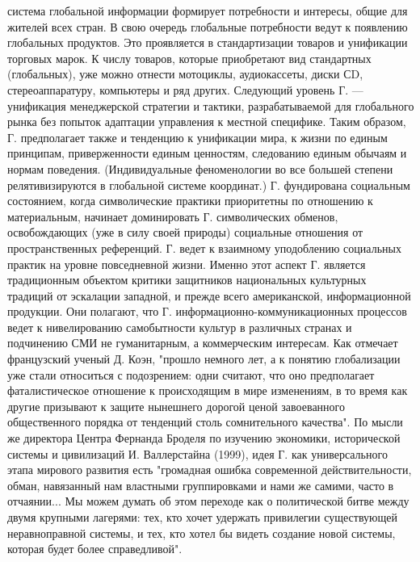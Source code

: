 \documentclass[12pt]{article}
\begin{document}
система глобальной информации формирует потребности и интересы, общие для жителей всех стран. В свою
очередь глобальные потребности ведут к появлению глобальных продуктов. Это проявляется в стандартизации
товаров и унификации торговых марок. К числу товаров, которые приобретают вид стандартных (глобальных),
уже  можно  отнести  мотоциклы,  аудиокассеты,  диски  СD,  стереоаппаратуру,  компьютеры  и  ряд  других.
Следующий уровень Г. --- унификация менеджерской стратегии и тактики, разрабатываемой для глобального
рынка без попыток адаптации управления к  местной специфике. Таким  образом, Г.  предполагает также и
тенденцию  к  унификации  мира,  к  жизни  по  единым  принципам,  приверженности  единым  ценностям,
следованию единым обычаям и нормам поведения. (Индивидуальные феноменологии во все большей степени
релятивизируются  в  глобальной  системе  координат.)  Г.  фундирована  социальным  состоянием,  когда
символические  практики  приоритетны  по  отношению  к  материальным,  начинает  доминировать  Г.
символических  обменов,  освобождающих  (уже  в  силу  своей  природы)  социальные  отношения  от
пространственных  референций.  Г.  ведет  к  взаимному  уподоблению  социальных  практик  на  уровне
повседневной  жизни.  Именно  этот  аспект  Г.  является  традиционным  объектом  критики  защитников
национальных культурных традиций от эскалации западной, и прежде всего американской, информационной
продукции.  Они  полагают,  что  Г.  информационно-коммуникационных  процессов  ведет  к  нивелированию
самобытности культур в различных странах и подчинению СМИ не гуманитарным, а коммерческим интересам.
Как  отмечает  французский  ученый  Д.  Коэн,  "прошло  немного  лет,  а  к  понятию  глобализации  уже  стали
относиться с подозрением: одни считают, что оно предполагает фаталистическое отношение к происходящим в
мире  изменениям,  в  то  время  как  другие  призывают  к  защите  нынешнего  дорогой  ценой  завоеванного
общественного порядка от тенденций столь сомнительного качества". По мысли же директора Центра Фернанда
Броделя по изучению экономики, исторической системы и цивилизаций И. Валлерстайна (1999), идея Г. как
универсального  этапа  мирового  развития  есть  "громадная  ошибка  современной  действительности,  обман,
навязанный нам властными группировками и нами же самими, часто в отчаянии... Мы можем думать об этом
переходе как о политической битве между двумя крупными лагерями: тех, кто хочет удержать привилегии
существующей неравноправной системы, и тех, кто хотел бы видеть создание новой системы, которая будет
более справедливой". 
\end{document}

